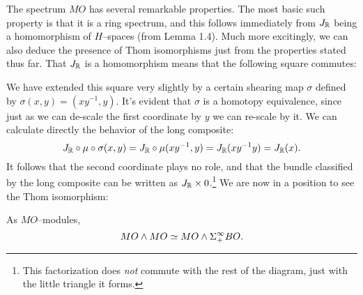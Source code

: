 The spectrum $MO$ has several remarkable properties.  The most basic such property is that it is a ring spectrum, and this follows immediately from $J_{\mathbb R}$ being a homomorphism of $H$--spaces (from Lemma 1.4).  Much more excitingly, we can also deduce the presence of Thom isomorphisms just from the properties stated thus far.  That $J_{\mathbb R}$ is a homomorphism means that the following square commutes:
\begin{center}
\end{center}
We have extended this square very slightly by a certain shearing map $\sigma$ defined by $\sigma(x, y) = (xy^{-1}, y)$.    It's evident that $\sigma$ is a homotopy equivalence, since just as we can de-scale the first coordinate by $y$ we can re-scale by it.  We can calculate directly the behavior of the long composite: \[J_{\mathbb R} \circ \mu \circ \sigma(x, y) = J_{\mathbb R} \circ \mu(xy^{-1}, y) = J_{\mathbb R}(xy^{-1}y) = J_{\mathbb R}(x).\]  It follows that the second coordinate plays no role, and that the bundle classified by the long composite can be written as $J_{\mathbb R} \times 0$.\footnote{This factorization does \emph{not} commute with the rest of the diagram, just with the little triangle it forms.}   We are now in a position to see the Thom isomorphism:
\begin{lemma} As $MO$--modules, \[MO \wedge MO \simeq MO \wedge \Sigma^\infty_+ BO.\]
\end{lemma}

